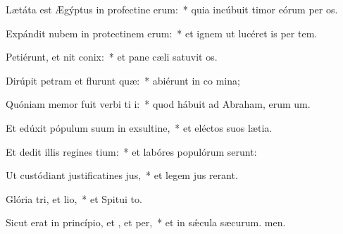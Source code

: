 \item Lætáta est Ægýptus in profectine erum:~* quia incúbuit timor eórum per os.
\item Expándit nubem in protectinem erum:~* et ignem ut lucéret is per tem.
\item Petiérunt, et nit conix:~* et pane cæli satuvit os.
\item Dirúpit petram et flurunt quæ:~* abiérunt in co mina;
\item Quóniam memor fuit verbi ti i:~* quod hábuit ad Abraham, erum um.
\item Et edúxit pópulum suum in exsultine,~* et eléctos suos  lætia.
\item Et dedit illis regines tium:~* et labóres populórum serunt:
\item Ut custódiant justificatines jus,~* et legem jus rerant.
\item Glória tri, et lio,~* et Spitui to.
\item Sicut erat in princípio, et , et per,~* et in sǽcula sæcurum. men.
